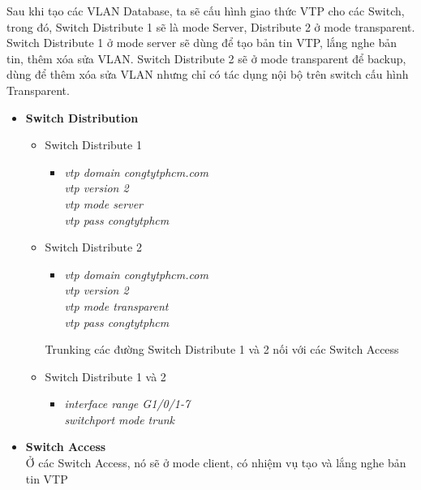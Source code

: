 \documentclass[12pt,a4paper]{report}
\begin{document}
\hspace*{1cm}Sau khi tạo các VLAN Database, ta sẽ cấu hình giao thức VTP cho các Switch, trong đó, Switch Distribute 1 sẽ là mode Server, Distribute 2 ở mode transparent. Switch Distribute 1 ở mode server sẽ dùng để tạo bản tin VTP, lắng nghe bản tin, thêm  xóa sửa VLAN. Switch Distribute 2 sẽ ở mode transparent để backup, dùng để thêm xóa sửa VLAN nhưng chỉ có tác dụng nội bộ trên switch cấu hình Transparent.

\begin{itemize}
  \item \textbf{Switch Distribution}
    \begin{itemize}
    \item Switch Distribute 1
    \begin{itemize}
      \item \textit{vtp domain congtytphcm.com\\
vtp version 2\\
vtp mode server\\
vtp pass congtytphcm}
    \end{itemize}
    \item Switch Distribute 2
     \begin{itemize}
      \item \textit{vtp domain congtytphcm.com\\
vtp version 2\\
vtp mode transparent\\
vtp pass congtytphcm\\}  
    \end{itemize}
    \hspace*{0.25cm} Trunking các đường  Switch Distribute 1 và 2 nối với các Switch Access 
     \item Switch Distribute 1 và 2
     \begin{itemize}
      \item \textit{interface range G1/0/1-7\\
                    switchport mode trunk}   
    \end{itemize}
   \end{itemize}
  \item \textbf{Switch Access}\\
\hspace*{1cm} Ở các Switch Access, nó sẽ ở mode client, có nhiệm vụ tạo và lắng nghe bản tin VTP\\

\end{itemize}
\end{document}
